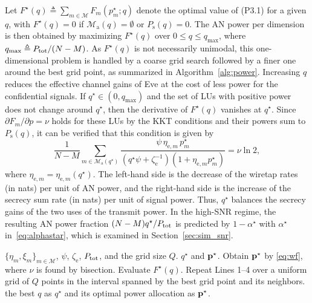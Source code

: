 \documentclass[journal]{IEEEtran}
\newcommand{\rev}[1]{{\color{red}#1}}
\newcommand{\rev}[1]{#1}
\begin{document}
Let $F^\star(q)\triangleq\sum_{m\in\mathcal M}F_m(p_m^\star;q)$ denote the optimal value of (P3.1) for a given $q$, with $F^\star(q)=0$ if $\mathcal M_{\mathrm a}(q)=\emptyset$ or $P_{\mathrm s}(q)=0$. The AN power per dimension is then obtained by maximizing $F^\star(q)$ over $0\le q\le q_{\max}$, where $q_{\max}\triangleq P_{\mathrm{tot}}/(N-M)$. As $F^\star(q)$ is not necessarily unimodal, this one-dimensional problem is handled by a coarse grid search followed by a finer one around the best grid point, as summarized in Algorithm~\ref{alg:power}. Increasing $q$ reduces the effective channel gains of Eve at the cost of less power for the confidential signals. If $q^\star\in(0,q_{\max})$ and the set of LUs with positive power does not change around $q^\star$, then the derivative of $F^\star(q)$ vanishes at $q^\star$. Since $\partial F_m/\partial p=\nu$ holds for these LUs by the KKT conditions and their powers sum to $P_{\mathrm s}(q)$, it can be verified that this condition is given by
\begin{equation}\label{eq:qstat}
\frac{1}{N-M}\sum_{m\in\mathcal M_{\mathrm a}(q^\star)}\frac{\psi\,\eta_{\mathrm{e},m}\,p_m^\star}{(q^\star\psi+\zeta_{\mathrm e}^{-1})(1+\eta_{\mathrm{e},m}p_m^\star)}=\nu\ln2,
\end{equation}
where $\eta_{\mathrm{e},m}=\eta_{\mathrm{e},m}(q^\star)$. The left-hand side is the decrease of the wiretap rates (in nats) per unit of AN power, and the right-hand side is the increase of the secrecy sum rate (in nats) per unit of signal power. Thus, $q^\star$ balances the secrecy gains of the two uses of the transmit power. In the high-SNR regime, the resulting AN power fraction $(N-M)q^\star/P_{\mathrm{tot}}$ is predicted by $1-\alpha^\star$ with $\alpha^\star$ in~\eqref{eq:alphastar}, which is examined in Section~\ref{sec:sim_snr}.

\begin{algorithm}[t]
\caption{Power Allocation for Given $\bt$}\label{alg:power}
\small\begin{algorithmic}[1]
\Require $\{\eta_m,\xi_m\}_{m\in\mathcal M}$, $\psi$, $\zeta_{\mathrm e}$, $P_{\mathrm{tot}}$, and the grid size $Q$.
\Ensure $q^\star$ and $\mathbf{p}^\star$.
  \State Obtain $\mathbf{p}^\star$ by \eqref{eq:wf}, where $\nu$ is found by bisection.
  \State Evaluate $F^\star(q)$.
\EndFor
\State Repeat Lines 1--4 over a uniform grid of $Q$ points \rev{in the interval spanned by the best grid point and its neighbors}.
\State \Return the best $q$ as $q^\star$ and its optimal power allocation as $\mathbf{p}^\star$.
\end{algorithmic}
\end{algorithm}
\end{document}
